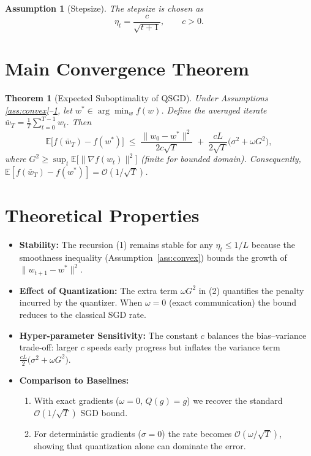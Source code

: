 \documentclass{article}
\newtheorem{theorem}{Theorem}
\newtheorem{assumption}{Assumption}
\newcommand{\E}{\mathbb{E}}
\begin{document}
\begin{assumption}[Stepsize]\label{ass:stepsize}
The stepsize is chosen as
\[
\eta_{t}= \frac{c}{\sqrt{t+1}},\qquad c>0.
\]
\end{assumption}

\section*{Main Convergence Theorem}
\begin{theorem}[Expected Suboptimality of QSGD]\label{thm:main}
Under Assumptions \ref{ass:convex}–\ref{ass:stepsize}, let $w^{*}\in\arg\min_{w}f(w)$.  
Define the averaged iterate $\bar w_{T}= \frac{1}{T}\sum_{t=0}^{T-1}w_{t}$. Then
\[
\E\!\big[f(\bar w_{T})-f(w^{*})\big]\;\le\;
\frac{\|w_{0}-w^{*}\|^{2}}{2c\sqrt{T}}
\;+\;
\frac{cL}{2\sqrt{T}}\big(\sigma^{2}+ \omega G^{2}\big),
\tag{2}
\]
where $G^{2}\ge \sup_{t}\E\!\big[\|\nabla f(w_{t})\|^{2}\big]$ (finite for bounded domain).  
Consequently, $\E[f(\bar w_{T})-f(w^{*})]=\mathcal{O}(1/\sqrt{T})$.
\end{theorem}

\section*{Theoretical Properties}
\begin{itemize}
\item \textbf{Stability:} The recursion (1) remains stable for any $\eta_{t}\le 1/L$ because the smoothness inequality (Assumption~\ref{ass:convex}) bounds the growth of $\|w_{t+1}-w^{*}\|^{2}$.
\item \textbf{Effect of Quantization:} The extra term $\omega G^{2}$ in (2) quantifies the penalty incurred by the quantizer. When $\omega=0$ (exact communication) the bound reduces to the classical SGD rate.
\item \textbf{Hyper‑parameter Sensitivity:} The constant $c$ balances the bias–variance trade‑off: larger $c$ speeds early progress but inflates the variance term $\frac{cL}{2}\big(\sigma^{2}+\omega G^{2}\big)$.
\item \textbf{Comparison to Baselines:}
\begin{enumerate}
\item With exact gradients ($\omega=0$, $Q(g)=g$) we recover the standard $\mathcal{O}(1/\sqrt{T})$ SGD bound.
\item For deterministic gradients ($\sigma=0$) the rate becomes $\mathcal{O}(\omega/\sqrt{T})$, showing that quantization alone can dominate the error.
\end{enumerate}
\end{itemize}
\end{document}
